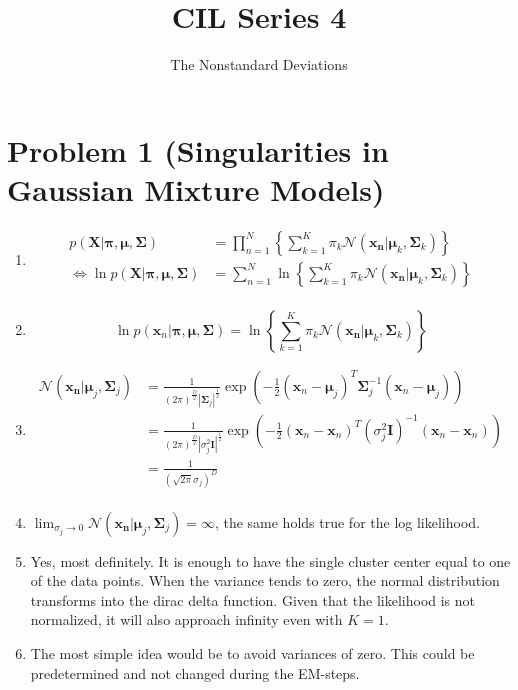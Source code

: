 \documentclass{scrartcl}
\title{CIL Series 4}
\author{The Nonstandard Deviations}
\newcommand{\abs}[1]{\left\lvert#1\right\rvert}
\begin{document}
  \maketitle

  \section{Problem 1 (Singularities in Gaussian Mixture Models)} %
  \label{sec:problem_1_singularities_in_gaussian_mixture_models_}
    \begin{enumerate}
      \item \begin{align*}
        p(\bm{X} | \bm{\pi}, \bm{\mu}, \bm{\Sigma}) &= \prod_{n=1}^N \left\{ \sum_{k=1}^K
          \pi_k \mathcal{N}(\bm{x_n} | \bm{\mu}_k, \bm{\Sigma}_k) \right\}\\
        \iff \ln p(\bm{X} | \bm{\pi}, \bm{\mu}, \bm{\Sigma}) &= \sum_{n=1}^N
          \ln\left\{\sum_{k=1}^{K} \pi_k \mathcal{N}(\bm{x_n} | \bm{\mu}_k, \bm{\Sigma}_k)\right\} \\
      \end{align*}
      \item \[
        \ln p(\bm{x}_n | \bm{\pi}, \bm{\mu}, \bm{\Sigma}) =
          \ln\left\{\sum_{k=1}^{K} \pi_k \mathcal{N}(\bm{x_n} | \bm{\mu}_k, \bm{\Sigma}_k)\right\}
      \]
      \item
      \begin{align*}
        \mathcal{N}(\bm{x_n} | \bm{\mu}_j, \bm{\Sigma}_{j})
          &= \frac{1}{(2 \pi)^{\frac{D}{2}} \abs{\bm{\Sigma}_j}^{\frac{1}{2}}}
          \exp \left( -\frac{1}{2} (\bm{x}_n - \bm{\mu}_j)^T \bm{\Sigma}_{j}^{-1} (\bm{x}_n - \bm{\mu}_j) \right) \\
          &= \frac{1}{(2 \pi)^{\frac{D}{2}} \abs{\sigma_j^2\bm{I}}^{\frac{1}{2}}}
          \exp \left( -\frac{1}{2} (\bm{x}_n - \bm{x}_n)^T (\sigma_j^2\bm{I})^{-1} (\bm{x}_n - \bm{x}_n) \right) \\
          &= \frac{1}{(\sqrt{2 \pi} \sigma_j)^{D}} \\
      \end{align*}
      \item $
        \lim_{\sigma_j \to 0} \mathcal{N}(\bm{x_n} | \bm{\mu}_j, \bm{\Sigma}_{j}) = \infty
      $, the same holds true for the log likelihood.

      \item Yes, most definitely. It is enough to have the single cluster center
        equal to one of the data points. When the variance tends to zero, the
        normal distribution transforms into the dirac delta function. Given that
        the likelihood is not normalized, it will also approach infinity even
        with $K = 1$.

      \item The most simple idea would be to avoid variances of zero. This could
        be predetermined and not changed during the EM-steps.
    \end{enumerate}
\end{document}
